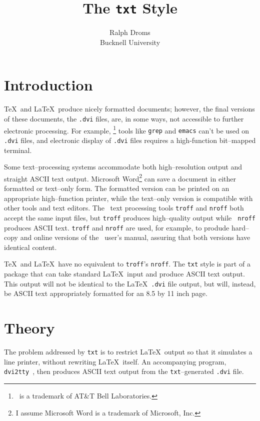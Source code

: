 
\title{The {\tt txt} Style}
\author{Ralph Droms \\ Bucknell University}



\maketitle
\section{Introduction}
\TeX\ and \LaTeX\ produce nicely formatted documents; however, the final
versions of these documents, the {\tt .dvi} files, are, in some ways,
not accessible to further electronic processing. For example,
\unix\footnote{\unix\ is a trademark of AT\&T Bell Laboratories.}
tools like {\tt grep} and {\tt emacs} can't be used on {\tt .dvi}
files, and electronic display of {\tt .dvi} files requires a
high-function bit--mapped terminal.

Some text--processing systems accommodate both high--resolution output
and straight ASCII text output. Microsoft Word\footnote{I assume
Microsoft Word is a trademark of Microsoft, Inc.} can save a document
in either formatted or text--only form.  The formatted version can be
printed on an appropriate high--function printer, while the text--only
version is compatible with other tools and text editors. The \unix\
text processing tools {\tt troff} and {\tt nroff} both accept the same
input files, but {\tt troff} produces high--quality output while {\tt
nroff} produces ASCII text. {\tt troff} and {\tt nroff} are used, for
example, to produde hard--copy and online versions of the \unix\
user's manual, assuring that both versions have identical content.

\TeX\ and \LaTeX\ have no equivalent to {\tt troff}'s {\tt nroff}.
The {\tt txt} style is part of a package that can take standard
\LaTeX\ input and produce ASCII text output.  This output will not be
identical to the \LaTeX\ {\tt .dvi} file output, but will, instead, be
ASCII text appropriately formatted for an 8.5 by 11 inch page.

\section{Theory}

The problem addressed by {\tt txt} is to restrict \LaTeX\ output so
that it simulates a line printer, without rewriting \LaTeX\ itself. An
accompanying program, {\tt dvi2tty}~\cite{dvi2tty}, then produces
ASCII text output from the {\tt txt}--generated {\tt .dvi} file.

